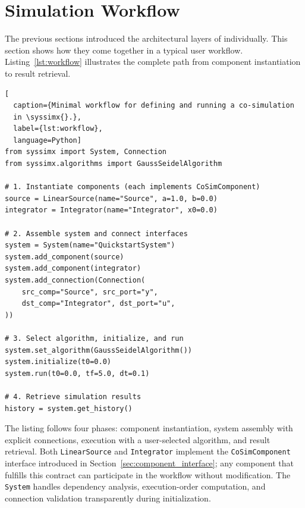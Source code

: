 \section{Simulation Workflow}
\label{sec:simulation_workflow}

The previous sections introduced the architectural layers of \syssimx{} individually.
This section shows how they come together in a typical user workflow.
Listing~\ref{lst:workflow} illustrates the complete path from component instantiation to result retrieval.

\begin{lstlisting}[
  caption={Minimal workflow for defining and running a co-simulation 
  in \syssimx{}.},
  label={lst:workflow},
  language=Python]
from syssimx import System, Connection
from syssimx.algorithms import GaussSeidelAlgorithm

# 1. Instantiate components (each implements CoSimComponent)
source = LinearSource(name="Source", a=1.0, b=0.0)
integrator = Integrator(name="Integrator", x0=0.0)

# 2. Assemble system and connect interfaces
system = System(name="QuickstartSystem")
system.add_component(source)
system.add_component(integrator)
system.add_connection(Connection(
    src_comp="Source", src_port="y",
    dst_comp="Integrator", dst_port="u",
))

# 3. Select algorithm, initialize, and run
system.set_algorithm(GaussSeidelAlgorithm())
system.initialize(t0=0.0)
system.run(t0=0.0, tf=5.0, dt=0.1)

# 4. Retrieve simulation results
history = system.get_history()
\end{lstlisting}

The listing follows four phases: component instantiation, system assembly 
with explicit connections, execution with a user-selected algorithm, and 
result retrieval.
Both \texttt{LinearSource} and \texttt{Integrator} implement the 
\texttt{CoSimComponent} interface introduced in 
Section~\ref{sec:component_interface}; any component that fulfills this 
contract can participate in the workflow without modification.
The \texttt{System} handles dependency analysis, execution-order 
computation, and connection validation transparently during initialization.
